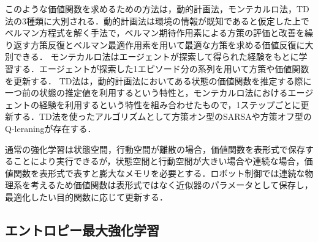 \documentclass[dvipdfmx]{ampbt_nomag}
\begin{document}
このような価値関数を求めるための方法は，動的計画法，モンテカルロ法，TD法の3種類に大別される．動的計画法は環境の情報が既知であると仮定した上でベルマン方程式を解く手法で，ベルマン期待作用素による方策の評価と改善を繰り返す方策反復とベルマン最適作用素を用いて最適な方策を求める価値反復に大別できる．
モンテカルロ法はエージェントが探索して得られた経験をもとに学習する．エージェントが探索した1エピソード分の系列を用いて方策や価値関数を更新する．
TD法は，動的計画法においてある状態の価値関数を推定する際に一つ前の状態の推定値を利用するという特性と，モンテカルロ法におけるエージェントの経験を利用するという特性を組み合わせたもので，1ステップごとに更新する．TD法を使ったアルゴリズムとして方策オン型のSARSAや方策オフ型のQ-leraningが存在する．

通常の強化学習は状態空間，行動空間が離散の場合，価値関数を表形式で保存することにより実行できるが，状態空間と行動空間が大きい場合や連続な場合，価値関数を表形式で表すと膨大なメモリを必要とする．ロボット制御では連続な物理系を考えるため価値関数は表形式ではなく近似器のパラメータとして保存し，最適化したい目的関数に応じて更新する．

\subsection{エントロピー最大強化学習}
\end{document}
